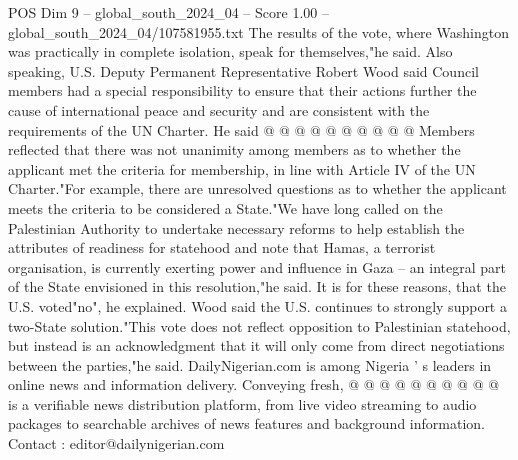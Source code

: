 \begin{textsample}{POS Dim 9 – global\_south\_2024\_04 – Score 1.00 – global\_south\_2024\_04/107581955.txt}
The results of the vote, where Washington was practically in complete isolation, speak for themselves,"he said.
Also speaking, U.S.
Deputy Permanent Representative Robert Wood said Council members had a special responsibility to ensure that their actions further the cause of international peace and security and are consistent with the requirements of the UN Charter.
He said @ @ @ @ @ @ @ @ @ @ Members reflected that there was not unanimity among members as to whether the applicant met the criteria for membership, in line with Article IV of the UN Charter."For example, there are unresolved questions as to whether the applicant meets the criteria to be considered a State."We have long called on the Palestinian Authority to undertake necessary reforms to help establish the attributes of readiness for statehood and note that Hamas, a terrorist organisation, is currently exerting power and influence in Gaza -- an integral part of the State envisioned in this resolution,"he said.
It is for these reasons, that the U.S. voted"no", he explained.
Wood said the U.S. continues to strongly support a two-State solution."This vote does not reflect opposition to Palestinian statehood, but instead is an acknowledgment that it will only come from direct negotiations between the parties,"he said.
DailyNigerian.com is among Nigeria ' s leaders in online news and information delivery.
Conveying fresh, @ @ @ @ @ @ @ @ @ @ is a verifiable news distribution platform, from live video streaming to audio packages to searchable archives of news features and background information.
Contact : editor@dailynigerian.com

\end{textsample}

